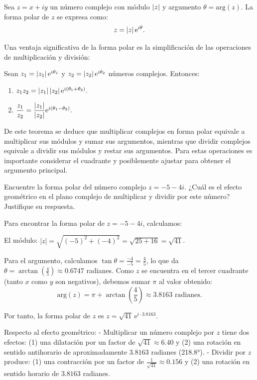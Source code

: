 \begin{definition} 
Sea $z=x+iy$ un número complejo con módulo $\left\vert z\right\vert$ y argumento $\theta=\text{arg}(z)$. La forma polar de $z$ se expresa como:
$$z=\left\vert z\right\vert\mathrm{e}^{i\theta}.$$
\end{definition}

Una ventaja significativa de la forma polar es la simplificación de las operaciones de multiplicación y división:

\begin{theorem}
Sean $z_1=\left\vert z_1\right\vert\mathrm{e}^{i\theta_1}$ y $z_2=\left\vert z_2\right\vert\mathrm{e}^{i\theta_2}$ números complejos. Entonces:
\begin{enumerate}[$1.$]
\item $z_1z_2=\left\vert z_1\right\vert\left\vert z_2\right\vert\mathrm{e}^{i(\theta_1 + \theta_2)}.$
\item $\dfrac{z_1}{z_2}=\dfrac{\left\vert z_1\right\vert}{\left\vert z_2\right\vert}\mathrm{e}^{i(\theta_1 - \theta_2)}.$
\end{enumerate}
\end{theorem}

\begin{rem} 
De este teorema se deduce que multiplicar complejos en forma polar equivale a multiplicar sus módulos y sumar sus argumentos, mientras que dividir complejos equivale a dividir sus módulos y restar sus argumentos. Para estas operaciones es importante considerar el cuadrante y posiblemente ajustar para obtener el argumento principal.
\end{rem}

\begin{prob} Encuentre la forma polar del número complejo $z=-5-4i.$ ¿Cuál es el efecto geométrico en el plano complejo de multiplicar y dividir por este número? Justifique su respuesta. \label{formapolar54i}

\begin{myproof}
Para encontrar la forma polar de $z=-5-4i$, calculamos:

El módulo: $|z|=\sqrt{(-5)^2+(-4)^2}=\sqrt{25+16}=\sqrt{41}$.

Para el argumento, calculamos $\tan\theta = \frac{-4}{-5}=\frac{4}{5}$, lo que da $\theta = \arctan\left(\frac{4}{5}\right) \approx 0.6747$ radianes. Como $z$ se encuentra en el tercer cuadrante (tanto $x$ como $y$ son negativos), debemos sumar $\pi$ al valor obtenido:
$$\text{arg}(z) = \pi+\arctan\left(\frac{4}{5}\right) \approx 3.8163 \text{ radianes}.$$

Por tanto, la forma polar de $z$ es $\boxed{z=\sqrt{41}\,\mathrm{e}^{i\cdot 3.8163}}$.

Respecto al efecto geométrico:
- Multiplicar un número complejo por $z$ tiene dos efectos: (1) una dilatación por un factor de $\sqrt{41} \approx 6.40$ y (2) una rotación en sentido antihorario de aproximadamente $3.8163$ radianes (218.8°).
- Dividir por $z$ produce: (1) una contracción por un factor de $\frac{1}{\sqrt{41}} \approx 0.156$ y (2) una rotación en sentido horario de $3.8163$ radianes.
\end{myproof}
\end{prob}


